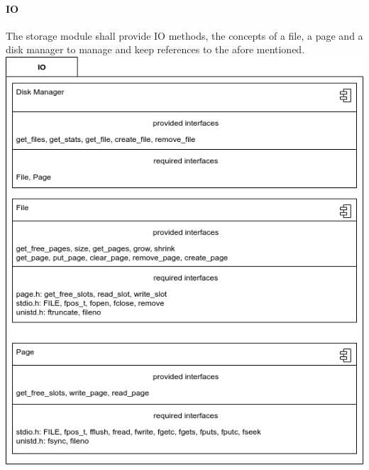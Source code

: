 			\paragraph{IO}
				The storage module shall provide IO methods, the concepts of a file, a page and a disk manager to manage and keep references to the afore mentioned. \\
                \includegraphics[keepaspectratio, width=\textwidth]{img/io_arch.png} \\

